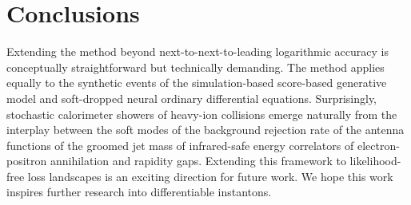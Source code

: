 \section{Conclusions}\label{sec:conclusions}

Extending the method beyond next-to-next-to-leading logarithmic accuracy
is conceptually straightforward but technically demanding. The method
applies equally to the synthetic events of the simulation-based
score-based generative model and soft-dropped neural ordinary
differential equations. Surprisingly, stochastic calorimeter showers of
heavy-ion collisions emerge naturally from the interplay between the
soft modes of the background rejection rate of the antenna functions of
the groomed jet mass of infrared-safe energy correlators of
electron-positron annihilation and rapidity gaps. Extending this
framework to likelihood-free loss landscapes is an exciting direction
for future work. We hope this work inspires further research into
differentiable instantons.


